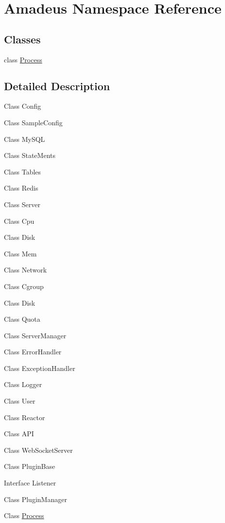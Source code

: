 \hypertarget{namespaceAmadeus}{}\section{Amadeus Namespace Reference}
\label{namespaceAmadeus}
\subsection*{Classes}
\begin{DoxyCompactItemize}
\item 
class \hyperlink{classAmadeus_1_1Process}{Process}
\end{DoxyCompactItemize}


\subsection{Detailed Description}
Class Config 

Class Sample\+Config 

Class My\+S\+QL 

Class State\+Ments 

Class Tables 

Class Redis 

Class Server 

Class Cpu 

Class Disk 

Class Mem 

Class Network 

Class Cgroup 

Class Disk 

Class Quota 

Class Server\+Manager 

Class Error\+Handler 

Class Exception\+Handler 

Class Logger 

Class User 

Class Reactor 

Class A\+PI 

Class Web\+Socket\+Server 

Class Plugin\+Base 

Interface Listener 

Class Plugin\+Manager 

Class \hyperlink{classAmadeus_1_1Process}{Process} 